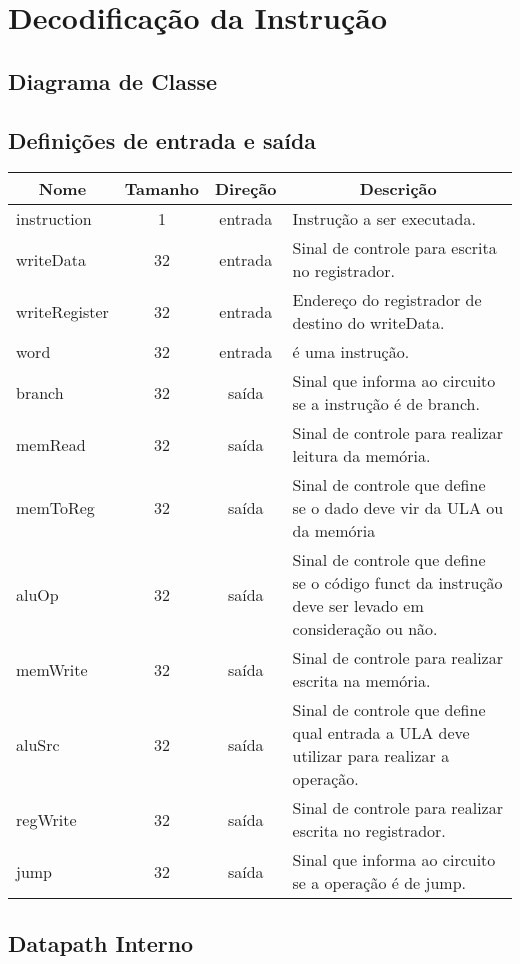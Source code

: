 \section{Decodificação da Instrução}
	\subsection{Diagrama de Classe}
  \begin{figure}[H]
    
  \end{figure}
		
		\subsection{Definições de entrada e saída}
		
	\begin{center}
		\begin{longtable}[pos]{| l | c | c | m{7cm} |} \hline
			\multicolumn{1}{|c|}{\cellcolor[gray]{0.9}\textbf{Nome}} & 
			\multicolumn{1}{c|}{\cellcolor[gray]{0.9}\textbf{Tamanho}} & 
			\multicolumn{1}{c|}{\cellcolor[gray]{0.9}\textbf{Direção}} &
			\multicolumn{1}{c|}{\cellcolor[gray]{0.9}\textbf{Descrição}} \\ \hline
			\endhead
			\hline
			\endlastfoot
			
			instruction & 1 & entrada & Instrução a ser executada. \\ \hline
			writeData & 32 & entrada & Sinal de controle para escrita no registrador. \\ \hline
			writeRegister & 32 & entrada & Endereço do registrador de destino do writeData. \\ \hline
			word & 32 & entrada & é uma instrução. \\ \hline
			branch & 32 & saída & Sinal que informa ao circuito se a instrução é de branch. \\ \hline
			memRead & 32 & saída & Sinal de controle para realizar leitura da memória. \\ \hline
			memToReg & 32 & saída & Sinal de controle que define se o dado deve vir da ULA ou da memória \\ \hline
			aluOp & 32 & saída & Sinal de controle que define se o código funct da instrução deve ser levado em consideração ou não. \\ \hline
			memWrite & 32 & saída & Sinal de controle para realizar escrita na memória. \\ \hline
			aluSrc & 32 & saída & Sinal de controle que define qual entrada a ULA deve utilizar para realizar a operação. \\ \hline
			regWrite & 32 & saída & Sinal de controle para realizar escrita no registrador. \\ \hline
			jump & 32 & saída & Sinal que informa ao circuito se a operação é de jump. \\ \hline
		\end{longtable}
	\end{center}
	
	\subsection{Datapath Interno}
	
